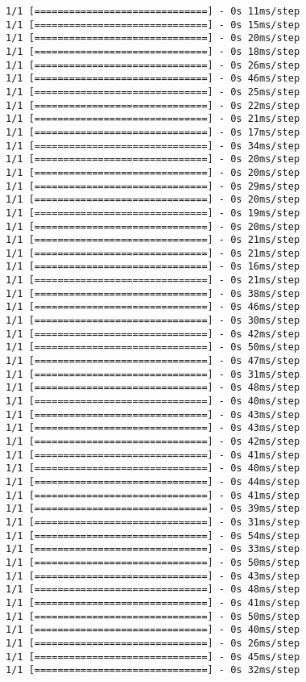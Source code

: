 \documentclass[11pt]{article}
\begin{document}
\begin{Verbatim}[commandchars=\\\{\}]
1/1 [==============================] - 0s 11ms/step
1/1 [==============================] - 0s 15ms/step
1/1 [==============================] - 0s 20ms/step
1/1 [==============================] - 0s 18ms/step
1/1 [==============================] - 0s 26ms/step
1/1 [==============================] - 0s 46ms/step
1/1 [==============================] - 0s 25ms/step
1/1 [==============================] - 0s 22ms/step
1/1 [==============================] - 0s 21ms/step
1/1 [==============================] - 0s 17ms/step
1/1 [==============================] - 0s 34ms/step
1/1 [==============================] - 0s 20ms/step
1/1 [==============================] - 0s 20ms/step
1/1 [==============================] - 0s 29ms/step
1/1 [==============================] - 0s 20ms/step
1/1 [==============================] - 0s 19ms/step
1/1 [==============================] - 0s 20ms/step
1/1 [==============================] - 0s 21ms/step
1/1 [==============================] - 0s 21ms/step
1/1 [==============================] - 0s 16ms/step
1/1 [==============================] - 0s 21ms/step
1/1 [==============================] - 0s 38ms/step
1/1 [==============================] - 0s 46ms/step
1/1 [==============================] - 0s 30ms/step
1/1 [==============================] - 0s 42ms/step
1/1 [==============================] - 0s 50ms/step
1/1 [==============================] - 0s 47ms/step
1/1 [==============================] - 0s 31ms/step
1/1 [==============================] - 0s 48ms/step
1/1 [==============================] - 0s 40ms/step
1/1 [==============================] - 0s 43ms/step
1/1 [==============================] - 0s 43ms/step
1/1 [==============================] - 0s 42ms/step
1/1 [==============================] - 0s 41ms/step
1/1 [==============================] - 0s 40ms/step
1/1 [==============================] - 0s 44ms/step
1/1 [==============================] - 0s 41ms/step
1/1 [==============================] - 0s 39ms/step
1/1 [==============================] - 0s 31ms/step
1/1 [==============================] - 0s 54ms/step
1/1 [==============================] - 0s 33ms/step
1/1 [==============================] - 0s 50ms/step
1/1 [==============================] - 0s 43ms/step
1/1 [==============================] - 0s 48ms/step
1/1 [==============================] - 0s 41ms/step
1/1 [==============================] - 0s 50ms/step
1/1 [==============================] - 0s 40ms/step
1/1 [==============================] - 0s 26ms/step
1/1 [==============================] - 0s 45ms/step
1/1 [==============================] - 0s 32ms/step

\end{Verbatim}
\end{document}

